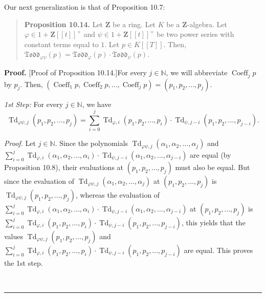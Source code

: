 \documentclass[numbers=enddot,12pt,final,onecolumn,notitlepage]{scrartcl}%
\newenvironment{proof}[1][Proof]{\noindent\textbf{#1.} }{\ \rule{0.5em}{0.5em}}
\begin{document}
Our next generalization is that of Proposition 10.7:

\begin{quote}
\textbf{Proposition 10.14.} Let $\mathbf{Z}$ be a ring. Let $K$ be a
$\mathbf{Z}$-algebra. Let $\varphi\in1+\mathbf{Z}\left[  \left[  t\right]
\right]  ^{+}$ and $\psi\in1+\mathbf{Z}\left[  \left[  t\right]  \right]
^{+}$ be two power series with constant terms equal to $1$. Let $p\in K\left[
\left[  T\right]  \right]  $. Then, $\mathfrak{Todd}_{\varphi\psi}\left(
p\right)  =\mathfrak{Todd}_{\varphi}\left(  p\right)  \cdot\mathfrak{Todd}%
_{\psi}\left(  p\right)  $.
\end{quote}

\begin{proof}
[Proof of Proposition 10.14.]For every $j\in\mathbb{N}$, we will abbreviate
$\operatorname*{Coeff}\nolimits_{j}p$ by $p_{j}$. Then, $\left(
\operatorname*{Coeff}\nolimits_{1}p,\operatorname*{Coeff}\nolimits_{2}%
p,...,\operatorname*{Coeff}\nolimits_{j}p\right)  =\left(  p_{1}%
,p_{2},...,p_{j}\right)  $.

\textit{1st Step:} For every $j\in\mathbb{N}$, we have%
\[
\operatorname*{Td}\nolimits_{\varphi\psi,j}\left(  p_{1},p_{2},...,p_{j}%
\right)  =\sum\limits_{i=0}^{j}\operatorname*{Td}\nolimits_{\varphi,i}\left(
p_{1},p_{2},...,p_{i}\right)  \cdot\operatorname*{Td}\nolimits_{\psi
,j-i}\left(  p_{1},p_{2},...,p_{j-i}\right)  .
\]


\textit{Proof.} Let $j\in\mathbb{N}$. Since the polynomials
$\operatorname*{Td}\nolimits_{\varphi\psi,j}\left(  \alpha_{1},\alpha
_{2},...,\alpha_{j}\right)  $ and $\sum\limits_{i=0}^{j}\operatorname*{Td}%
\nolimits_{\varphi,i}\left(  \alpha_{1},\alpha_{2},...,\alpha_{i}\right)
\cdot\operatorname*{Td}\nolimits_{\psi,j-i}\left(  \alpha_{1},\alpha
_{2},...,\alpha_{j-i}\right)  $ are equal (by Proposition 10.8), their
evaluations at $\left(  p_{1},p_{2},...,p_{j}\right)  $ must also be equal.
But since the evaluation of $\operatorname*{Td}\nolimits_{\varphi\psi
,j}\left(  \alpha_{1},\alpha_{2},...,\alpha_{j}\right)  $ at $\left(
p_{1},p_{2},...,p_{j}\right)  $ is $\operatorname*{Td}\nolimits_{\varphi
\psi,j}\left(  p_{1},p_{2},...,p_{j}\right)  $, whereas the evaluation of
$\sum\limits_{i=0}^{j}\operatorname*{Td}\nolimits_{\varphi,i}\left(
\alpha_{1},\alpha_{2},...,\alpha_{i}\right)  \cdot\operatorname*{Td}%
\nolimits_{\psi,j-i}\left(  \alpha_{1},\alpha_{2},...,\alpha_{j-i}\right)  $
at $\left(  p_{1},p_{2},...,p_{j}\right)  $ is $\sum\limits_{i=0}%
^{j}\operatorname*{Td}\nolimits_{\varphi,i}\left(  p_{1},p_{2},...,p_{i}%
\right)  \cdot\operatorname*{Td}\nolimits_{\psi,j-i}\left(  p_{1}%
,p_{2},...,p_{j-i}\right)  $, this yields that the values $\operatorname*{Td}%
\nolimits_{\varphi\psi,j}\left(  p_{1},p_{2},...,p_{j}\right)  $ and
$\sum\limits_{i=0}^{j}\operatorname*{Td}\nolimits_{\varphi,i}\left(
p_{1},p_{2},...,p_{i}\right)  \cdot\operatorname*{Td}\nolimits_{\psi
,j-i}\left(  p_{1},p_{2},...,p_{j-i}\right)  $ are equal. This proves the 1st step.


\end{proof}
\end{document}
